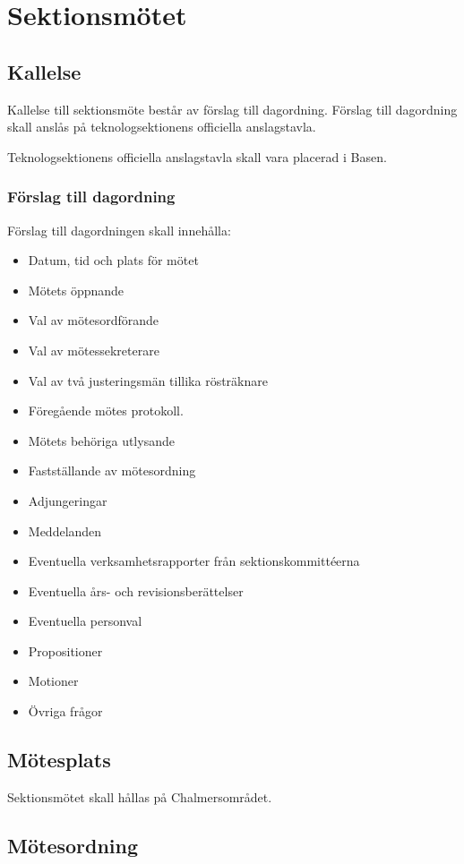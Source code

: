 \section{Sektionsmötet}

\subsection{Kallelse} 
Kallelse till sektionsmöte består av förslag till dagordning. Förslag till dagordning skall anslås på teknologsektionens officiella anslagstavla.

Teknologsektionens officiella anslagstavla skall vara placerad i Basen. 

\subsubsection{Förslag till dagordning}
Förslag till dagordningen skall innehålla:
\begin{itemize}  
  \item Datum, tid och plats för mötet 
  \item Mötets öppnande 
  \item Val av mötesordförande 
  \item Val av mötessekreterare 
  \item Val av två justeringsmän tillika rösträknare 
  \item Föregående mötes protokoll. 
  \item Mötets behöriga utlysande 
  \item Fastställande av mötesordning 
  \item Adjungeringar 
  \item Meddelanden 
  \item Eventuella verksamhetsrapporter från sektionskommittéerna 
  \item Eventuella års- och revisionsberättelser 
  \item Eventuella personval 
  \item Propositioner 
  \item Motioner 
  \item Övriga frågor 
\end{itemize}
\subsection{Mötesplats} 
Sektionsmötet skall hållas på Chalmersområdet. 
\subsection{Mötesordning}
